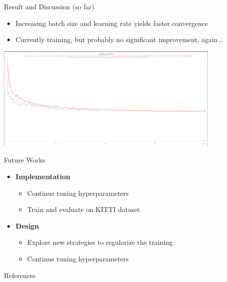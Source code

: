 \documentclass[10pt]{beamer}
\begin{document}
\begin{frame}{Result and Discussion (so far)}
    \begin{itemize}
        \item Increasing batch size and learning rate yields faster convergence
        \item Currently training, but probably no significant improvement, again...
    \end{itemize}
    \centering
    \includegraphics[width=11cm]{result_diff_bs-lr.PNG}
\end{frame}

\begin{frame}[t]{Future Works}
    \begin{itemize}
        \item \textbf{Implementation}
        \begin{itemize}
            \item Continue tuning hyperparameters
            \item Train and evaluate on KITTI dataset
        \end{itemize}
        \item \textbf{Design}
        \begin{itemize}
            \item Explore new strategies to regularize the training
            \item Continue tuning hyperparameters
        \end{itemize}
    \end{itemize}
\end{frame}

\begin{frame}[t, noframenumbering]{References}
    \scriptsize
    \nocite{*}
    
    
\end{frame}
\end{document}
